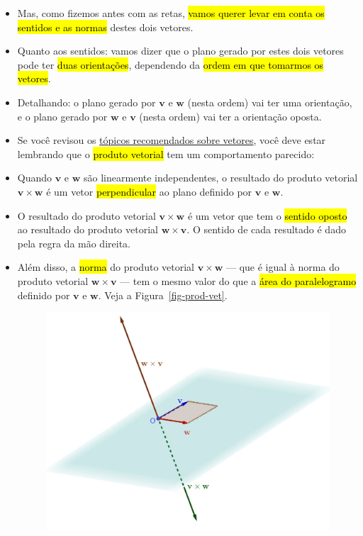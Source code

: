 \documentclass[
  letterpaper,
  DIV=11,
  numbers=noendperiod]{scrreprt}
\begin{document}
\begin{itemize}
\begin{figure}[t]
  \end{figure}
\item
  Mas, como fizemos antes com as retas, {\hl{vamos querer levar em conta
  os sentidos e as normas}} destes dois vetores.
\item
  Quanto aos sentidos: vamos dizer que o plano gerado por estes dois
  vetores pode ter {\hl{duas orientações}}, dependendo da {\hl{ordem em
  que tomarmos os vetores}}.
\item
  Detalhando: o plano gerado por $\mathbf{v}$ e $\mathbf{w}$ (nesta
  ordem) vai ter uma orientação, e o plano gerado por $\mathbf{w}$ e
  $\mathbf{v}$ (nesta ordem) vai ter a orientação oposta.
\item
  Se você revisou os \protect\hyperlink{topicos-vetores}{tópicos
  recomendados sobre vetores}, você deve estar lembrando que o
  {\hl{produto vetorial}} tem um comportamento parecido:
\item
  Quando $\mathbf{v}$ e $\mathbf{w}$ são linearmente independentes, o
  resultado do produto vetorial $\mathbf{v} \times \mathbf{w}$ é um
  vetor {\hl{perpendicular}} ao plano definido por $\mathbf{v}$ e
  $\mathbf{w}$.
\item
  O resultado do produto vetorial $\mathbf{v} \times \mathbf{w}$ é um
  vetor que tem o {\hl{sentido oposto}} ao resultado do produto vetorial
  $\mathbf{w} \times \mathbf{v}$. O sentido de cada resultado é dado
  pela regra da mão direita.
\item
  Além disso, a {\hl{norma}} do produto vetorial
  $\mathbf{v} \times \mathbf{w}$ --- que é igual à norma do produto
  vetorial $\mathbf{w} \times \mathbf{v}$ --- tem o mesmo valor do que a
  {\hl{área do paralelogramo}} definido por $\mathbf{v}$ e $\mathbf{w}$.
  Veja a Figura~\ref{fig-prod-vet}.

  \begin{figure}[t]

  {\centering \includegraphics[width=1\textwidth,height=\textheight]{figures/prod-vet.jpg}

}
\end{figure}
\end{itemize}
\end{document}
